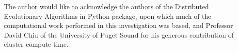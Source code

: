 The author would like to acknowledge the authors of the Distributed Evolutionary Algorithms in Python package, upon which much of the computational work performed in this investigation was based, and Professor David Chiu of the University of Puget Sound for his generous contribution of cluster compute time.